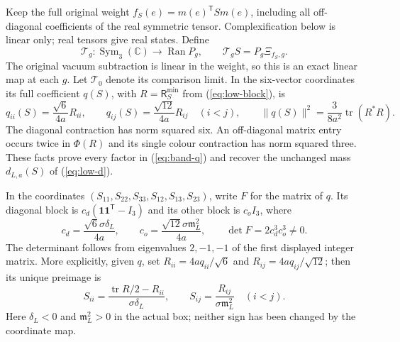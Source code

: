 Keep the full original weight $f_S(e)=m(e)^{\mathsf T}S m(e)$,
including all off-diagonal coefficients of the real symmetric tensor.
Complexification below is linear only; real tensors give real states.
Define
\begin{equation}\label{eq:band-tensor-map}
 \mathcal T_g:\operatorname{Sym}_3(\mathbb C)\longrightarrow
       \operatorname{Ran}P_g,\qquad
 \mathcal T_gS=P_g\Xi_{f_S,g}.
\end{equation}
The original vacuum subtraction is linear in the weight, so this
is an exact linear map at each $g$. Let $\mathcal T_0$ denote its
comparison limit. In the six-vector coordinates its full coefficient
$q(S)$, with $R=\mathsf R_S^{\min}$ from (\ref{eq:low-block}), is
\begin{equation}\label{eq:band-q}
 q_{ii}(S)=\frac{\sqrt6}{4a}R_{ii},\qquad
 q_{ij}(S)=\frac{\sqrt{12}}{4a}R_{ij}\quad(i<j),\qquad
 \|q(S)\|^2=\frac3{8a^2}\operatorname{tr}(R^*R).
\end{equation}
The diagonal contraction has norm squared six. An off-diagonal
matrix entry occurs twice in $\Phi(R)$ and its single colour
contraction has norm squared three. These facts prove every factor
in (\ref{eq:band-q}) and recover the unchanged mass
$d_{L,a}(S)$ of (\ref{eq:low-d}).

In the coordinates $(S_{11},S_{22},S_{33},S_{12},S_{13},S_{23})$,
write $F$ for the matrix of $q$. Its diagonal block is
$c_d(\boldsymbol 1\boldsymbol 1^{\mathsf T}-I_3)$ and its other
block is $c_oI_3$, where
\[
 c_d=\frac{\sqrt6\sigma\delta_L}{4a},\qquad
 c_o=\frac{\sqrt{12}\sigma\mathfrak m_L^2}{4a},\qquad
 \det F=2c_d^3c_o^3\ne0.
\]
The determinant follows from eigenvalues $2,-1,-1$ of the first
displayed integer matrix. More explicitly, given $q$, set
$R_{ii}=4a q_{ii}/\sqrt6$ and $R_{ij}=4a q_{ij}/\sqrt{12}$;
then its unique preimage is
\begin{equation}\label{eq:band-F-inverse}
 S_{ii}=\frac{\operatorname{tr}R/2-R_{ii}}{\sigma\delta_L},
 \qquad S_{ij}=\frac{R_{ij}}{\sigma\mathfrak m_L^2}\quad(i<j).
\end{equation}
Here $\delta_L<0$ and $\mathfrak m_L^2>0$ in the actual box;
neither sign has been changed by the coordinate map.

